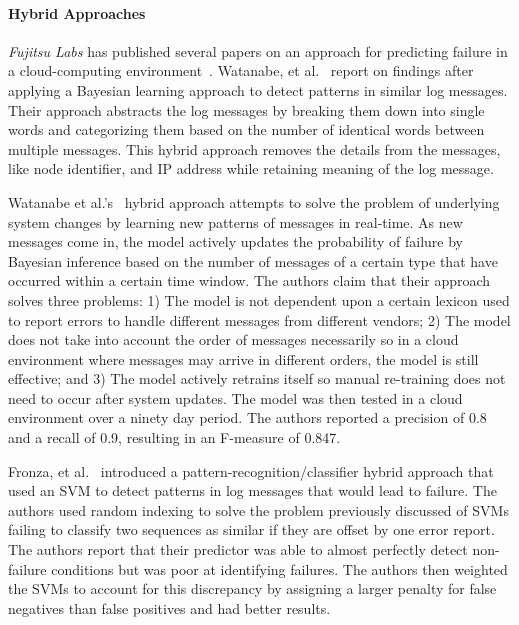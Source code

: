 \paragraph{Hybrid Approaches}
\emph{Fujitsu Labs} has published several papers on an approach for predicting
failure in a cloud-computing
environment~\cite{sonoda2012,watanabe2012,watanabe2014}.  Watanabe, et
al.~\cite{watanabe2012, watanabe2014} report on findings after applying a
Bayesian learning approach to detect patterns in similar log messages.  Their
approach abstracts the log messages by breaking them down into single words and
categorizing them based on the number of identical words between multiple
messages.  This hybrid approach removes the details from the messages, like
node identifier, and \ac{IP} address while retaining meaning of the log
message.

Watanabe et al.'s~\cite{watanabe2014} hybrid approach attempts to solve the
problem of underlying system changes by learning new patterns of messages in
real-time.  As new messages come in, the model actively updates the probability
of failure by Bayesian inference based on the number of messages of a certain
type that have occurred within a certain time window.  The authors claim that
their approach solves three problems: 1)  The model is not dependent upon a
certain lexicon used to report errors to handle different messages from
different vendors; 2) The model does not take into account the order of
messages necessarily so in a cloud environment where messages may arrive in
different orders, the model is still effective; and 3)  The model actively
retrains itself so manual re-training does not need to occur after system
updates.  The model was then tested in a cloud environment over a ninety day
period.  The authors reported a precision of 0.8 and a recall of 0.9, resulting
in an F-measure of 0.847.  

Fronza, et al.~\cite{fronza2013} introduced a pattern-recognition/classifier
hybrid approach that used an \ac{SVM} to detect patterns in log messages that
would lead to failure.  The authors used random indexing to solve the problem
previously discussed of \ac{SVM}s failing to classify two sequences as similar
if they are offset by one error report.  The authors report that their
predictor was able to almost perfectly detect non-failure conditions but was
poor at identifying failures.  The authors then weighted the \ac{SVM}s to
account for this discrepancy by assigning a larger penalty for false negatives
than false positives and had better results.

